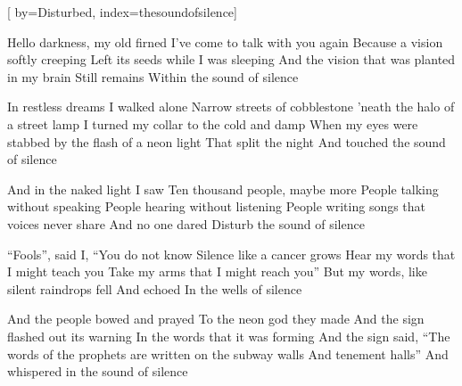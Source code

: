 
[%
    by={Disturbed},
    index={thesoundofsilence}]


    \label{thesoundofsilence}

    \beginverse
        Hello darkness, my old firned
        I've come to talk with you again
        Because a vision softly creeping
        Left its seeds while I was sleeping
        And the vision that was planted in my brain
        Still remains
        Within the sound of silence
    \endverse

    \beginverse
        In restless dreams I walked alone
        Narrow streets of cobblestone
        'neath the halo of a street lamp
        I turned my collar to the cold and damp
        When my eyes were stabbed by the flash of a neon light
        That split the night
        And touched the sound of silence
    \endverse

    \beginverse
        And in the naked light I saw
        Ten thousand people, maybe more
        People talking without speaking
        People hearing without listening
        People writing songs that voices never share
        And no one dared
        Disturb the sound of silence
    \endverse

    \beginverse
        ``Fools'', said I, ``You do not know
        Silence like a cancer grows
        Hear my words that I might teach you
        Take my arms that I might reach you''
        But my words, like silent raindrops fell
        And echoed
        In the wells of silence
    \endverse

    \beginverse
        And the people bowed and prayed
        To the neon god they made
        And the sign flashed out its warning
        In the words that it was forming
        And the sign said, ``The words of the prophets are written on the subway walls
        And tenement halls''
        And whispered in the sound of silence
    \endverse
\endsong
